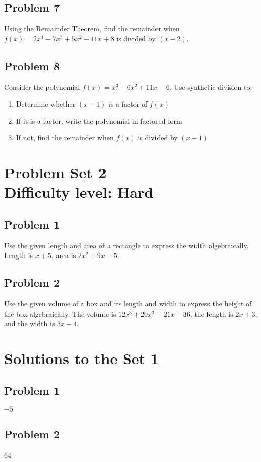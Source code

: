 \documentclass[12pt]{article}
\begin{document}
\subsection*{Problem 7}
Using the Remainder Theorem, find the remainder when \( f(x) = 2x^4 - 7x^3 + 5x^2 - 11x + 8 \) is divided by \( (x - 2) \).

\subsection*{Problem 8}
Consider the polynomial \( f(x) = x^3 - 6x^2 + 11x - 6 \). Use synthetic division to:
\begin{enumerate}[label=(\alph*)]
    \item Determine whether \( (x - 1) \) is a factor of \( f(x) \)
    \item If it is a factor, write the polynomial in factored form
    \item If not, find the remainder when \( f(x) \) is divided by \( (x - 1) \)
\end{enumerate}

\section*{Problem Set 2\\Difficulty level: Hard}
\subsection*{Problem 1}
Use the given length and area of a rectangle to express the width algebraically. Length is \(x+5\), area is \(2x^2+9x-5\).

\subsection*{Problem 2}
Use the given volume of a box and its length and width to express the height of the box algebraically. The volume is \(12x^3 + 20x^2 - 21x - 36\), the length is \(2x + 3\), and the width is \(3x - 4\).

\newpage
\section*{Solutions to the Set 1}
\subsection*{Problem 1} \(-5\)
\subsection*{Problem 2} 64
\end{document}
